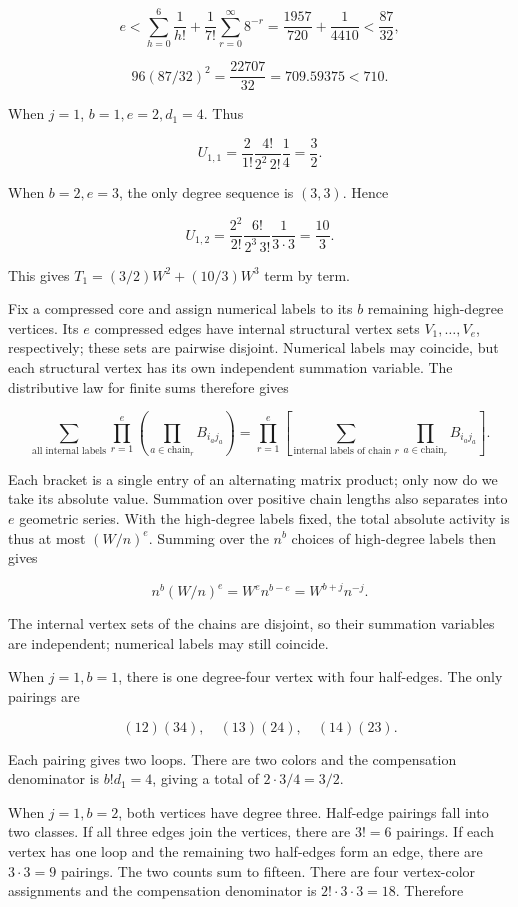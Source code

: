\documentclass[11pt,a4paper]{article}
\begin{document}
\[
e<\sum_{h=0}^6\frac1{h!}+\frac1{7!}\sum_{r=0}^{\infty}8^{-r}
=\frac{1957}{720}+\frac1{4410}<\frac{87}{32},
\]

\[
96(87/32)^2=\frac{22707}{32}=709.59375<710.
\]

When \(j=1\), \(b=1,e=2,d_1=4\). Thus

\[
U_{1,1}=\frac2{1!}\frac{4!}{2^2\,2!}\frac14=\frac32.
\]

When \(b=2,e=3\), the only degree sequence is \((3,3)\). Hence

\[
U_{1,2}=\frac{2^2}{2!}\frac{6!}{2^3\,3!}\frac1{3\cdot3}=\frac{10}{3}.
\]

This gives \(T_1=(3/2)W^2+(10/3)W^3\) term by term.

Fix a compressed core and assign numerical labels to its \(b\) remaining high-degree vertices. Its \(e\) compressed edges have internal structural vertex sets \(V_1,\ldots,V_e\), respectively; these sets are pairwise disjoint. Numerical labels may coincide, but each structural vertex has its own independent summation variable. The distributive law for finite sums therefore gives

\[
\sum_{\text{all internal labels}}\prod_{r=1}^e
\left(\prod_{a\in\mathrm{chain}_r}B_{i_aj_a}\right)
=\prod_{r=1}^e\left[
\sum_{\text{internal labels of chain }r\text{}}
\prod_{a\in\mathrm{chain}_r}B_{i_aj_a}\right].
\]

Each bracket is a single entry of an alternating matrix product; only now do we take its absolute value. Summation over positive chain lengths also separates into \(e\) geometric series. With the high-degree labels fixed, the total absolute activity is thus at most \((W/n)^e\). Summing over the \(n^b\) choices of high-degree labels then gives

\[
n^b(W/n)^e=W^en^{b-e}=W^{b+j}n^{-j}.
\]

The internal vertex sets of the chains are disjoint, so their summation variables are independent; numerical labels may still coincide.

When \(j=1,b=1\), there is one degree-four vertex with four half-edges. The only pairings are

\[
(12)(34),\quad(13)(24),\quad(14)(23).
\]

Each pairing gives two loops. There are two colors and the compensation denominator is \(b!d_1=4\), giving a total of \(2\cdot3/4=3/2\).

When \(j=1,b=2\), both vertices have degree three. Half-edge pairings fall into two classes. If all three edges join the vertices, there are \(3!=6\) pairings. If each vertex has one loop and the remaining two half-edges form an edge, there are \(3\cdot3=9\) pairings. The two counts sum to fifteen. There are four vertex-color assignments and the compensation denominator is \(2!\cdot3\cdot3=18\). Therefore
\end{document}
